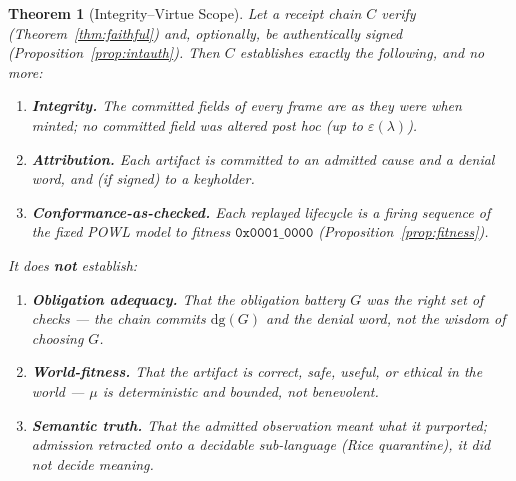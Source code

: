 \documentclass[11pt,oneside]{book}
\theoremstyle{definition}
\theoremstyle{plain}
\newtheorem{theorem}{Theorem}[chapter]
\theoremstyle{remark}
\newcommand{\muop}{\mu}                        %
\newcommand{\dg}{\mathrm{dg}}                   %
\newcommand{\code}[1]{\texttt{#1}}
\newcommand{\Ledger}{C}               %
\begin{document}
\begin{theorem}[Integrity--Virtue Scope]\label{thm:scope}
Let a receipt chain $\Ledger$ verify (Theorem~\ref{thm:faithful}) and, optionally, be
authentically signed (Proposition~\ref{prop:intauth}). %
Then $\Ledger$ establishes exactly the
following, and no more: %
\begin{enumerate}[label=(\Alph*),leftmargin=*]
\item \textbf{Integrity.} The committed fields of every frame are as they were when minted;
no committed field was altered post hoc (up to $\varepsilon(\lambda)$). %
\item \textbf{Attribution.} Each artifact is committed to an admitted cause and a denial word,
and (if signed) to a keyholder. %
\item \textbf{Conformance-as-checked.} Each replayed lifecycle is a firing sequence of the
\emph{fixed} POWL model to fitness $\code{0x0001\_0000}$ (Proposition~\ref{prop:fitness}). %
\end{enumerate}
It does \textbf{not} establish: %
\begin{enumerate}[label=(\alph*),leftmargin=*]
\item \textbf{Obligation adequacy.} That the obligation battery $G$ was the \emph{right} set of
checks --- the chain commits $\dg(G)$ and the denial word, not the wisdom of choosing $G$. %
\item \textbf{World-fitness.} That the artifact is correct, safe, useful, or ethical in the
world --- $\muop$ is deterministic and bounded, not benevolent. %
\item \textbf{Semantic truth.} That the admitted observation \emph{meant} what it purported;
admission retracted onto a decidable sub-language (Rice quarantine), it did not decide meaning. %
\end{enumerate}
\end{theorem}
\end{document}
